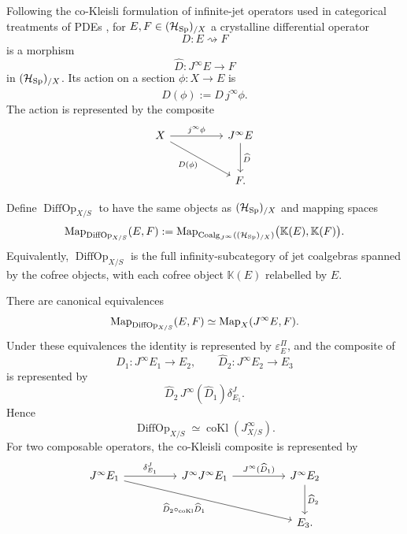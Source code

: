 \begin{definition}
Following the co-Kleisli formulation of infinite-jet operators used in
categorical treatments of PDEs
\cite{Marvan1986,KhavkineSchreiber2017}, for
\(E,F\in(\mathcal H_{\operatorname{Sp}})_{/X}\) a crystalline differential operator
\[
  D:E\rightsquigarrow F
\]
is a morphism
\[
  \widehat D:J^\infty E\to F
\]
in \((\mathcal H_{\operatorname{Sp}})_{/X}\). Its action on a section \(\phi:X\to E\) is
\[
  D(\phi):=\widehat D\,j^\infty\phi.
\]
The action is represented by the composite
\[
\begin{tikzcd}[column sep=huge,row sep=large]
X \ar[r,"j^\infty\phi"] \ar[dr,"D(\phi)"']
&
J^\infty E \ar[d,"\widehat D"]\\
& F .
\end{tikzcd}
\]
\end{definition}

\begin{construction}
Define \(\operatorname{DiffOp}_{X/S}\) to have the same objects as \((\mathcal H_{\operatorname{Sp}})_{/X}\) and mapping
spaces
\[
  \operatorname{Map}_{\operatorname{DiffOp}_{X/S}}(E,F)
  :=
  \operatorname{Map}_{\operatorname{Coalg}_{J^\infty}((\mathcal H_{\operatorname{Sp}})_{/X})}
  \bigl(\mathbb K(E),\mathbb K(F)\bigr).
\]
Equivalently, \(\operatorname{DiffOp}_{X/S}\) is the full infinity-subcategory of jet
coalgebras spanned by the cofree objects, with each cofree object \(\mathbb K(E)\) relabelled by \(E\).
\end{construction}

\begin{proposition}
\label{prop:cokleisli}
There are canonical equivalences
\[
  \operatorname{Map}_{\operatorname{DiffOp}_{X/S}}(E,F)
  \simeq
  \operatorname{Map}_X(J^\infty E,F).
\]
Under these equivalences the identity is represented by \(\varepsilon^\Pi_E\), and
the composite of
\[
  \widehat D_1:J^\infty E_1\to E_2,
  \qquad
  \widehat D_2:J^\infty E_2\to E_3
\]
is represented by
\[
  \widehat D_2\,J^\infty(\widehat D_1)\delta^J_{E_1}.
\]
Hence
\[
  \operatorname{DiffOp}_{X/S}\simeq\operatorname{coKl}(J^\infty_{X/S}).
\]
For two composable operators, the co-Kleisli composite is represented by
\[
\begin{tikzcd}[column sep=huge,row sep=large]
J^\infty E_1
  \ar[r,"\delta^J_{E_1}"]
  \ar[drr,"\widehat D_2\circ_{\mathrm{coKl}}\widehat D_1"']
&
J^\infty J^\infty E_1
  \ar[r,"J^\infty(\widehat D_1)"]
&
J^\infty E_2
  \ar[d,"\widehat D_2"]\\
&& E_3 .
\end{tikzcd}
\]
\end{proposition}


